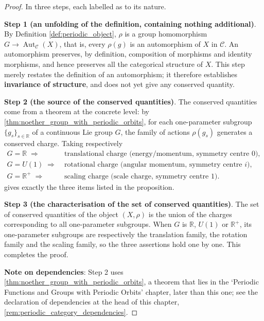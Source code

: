 \begin{proof}
In three steps, each labelled as to its nature.

\textbf{Step 1 (an unfolding of the definition, containing nothing additional)}. By Definition \ref{def:periodic_object}, $\rho$ is a group homomorphism $G \to \operatorname{Aut}_{\mathcal{C}}(X)$, that is, every $\rho(g)$ is an automorphism of $X$ in $\mathcal{C}$. An automorphism preserves, by definition, composition of morphisms and identity morphisms, and hence preserves all the categorical structure of $X$. This step merely restates the definition of an automorphism; it therefore establishes \textbf{invariance of structure}, and does not yet give any conserved quantity.

\textbf{Step 2 (the source of the conserved quantities)}. The conserved quantities come from a theorem at the concrete level: by \cref{thm:noether_group_with_periodic_orbits}, for each one-parameter subgroup $\{g_s\}_{s \in \mathbb{R}}$ of a continuous Lie group $G$, the family of actions $\rho(g_s)$ generates a conserved charge. Taking respectively
\[
\begin{aligned}
G = \mathbb{R} \;\Rightarrow\; &\text{translational charge (energy/momentum, symmetry centre } 0\text{)},\\
G = U(1) \;\Rightarrow\; &\text{rotational charge (angular momentum, symmetry centre } i\text{)},\\
G = \mathbb{R}^+ \;\Rightarrow\; &\text{scaling charge (scale charge, symmetry centre } 1\text{)}.
\end{aligned}
\]
gives exactly the three items listed in the proposition.

\textbf{Step 3 (the characterisation of the set of conserved quantities)}. The set of conserved quantities of the object $(X, \rho)$ is the union of the charges corresponding to all one-parameter subgroups. When $G$ is $\mathbb{R}$, $U(1)$ or $\mathbb{R}^+$, its one-parameter subgroups are respectively the translation family, the rotation family and the scaling family, so the three assertions hold one by one. This completes the proof.

\textbf{Note on dependencies}: Step 2 uses \cref{thm:noether_group_with_periodic_orbits}, a theorem that lies in the `Periodic Functions and Groups with Periodic Orbits' chapter, later than this one; see the declaration of dependencies at the head of this chapter, \cref{rem:periodic_category_dependencies}.
\end{proof}

